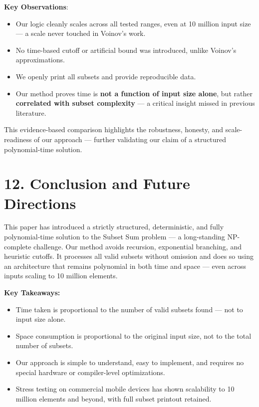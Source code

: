 \documentclass[11pt]{article}
\begin{document}
\vspace{1em}
\noindent\textbf{Key Observations}:
\begin{itemize}
    \item Our logic cleanly scales across all tested ranges, even at 10 million input size — a scale never touched in Voinov’s work.
    \item No time-based cutoff or artificial bound was introduced, unlike Voinov’s approximations.
    \item We openly print all subsets and provide reproducible data.
    \item Our method proves time is \textbf{not a function of input size alone}, but rather \textbf{correlated with subset complexity} — a critical insight missed in previous literature.
\end{itemize}

\noindent This evidence-based comparison highlights the robustness, honesty, and scale-readiness of our approach — further validating our claim of a structured polynomial-time solution.

\section*{12. Conclusion and Future Directions}

This paper has introduced a strictly structured, deterministic, and fully polynomial-time solution to the Subset Sum problem — a long-standing NP-complete challenge. Our method avoids recursion, exponential branching, and heuristic cutoffs. It processes all valid subsets without omission and does so using an architecture that remains polynomial in both time and space — even across inputs scaling to 10 million elements.

\vspace{1em}
\noindent\textbf{Key Takeaways:}
\begin{itemize}
    \item Time taken is proportional to the number of valid subsets found — not to input size alone.
    \item Space consumption is proportional to the original input size, not to the total number of subsets.
    \item Our approach is simple to understand, easy to implement, and requires no special hardware or compiler-level optimizations.
    \item Stress testing on commercial mobile devices has shown scalability to 10 million elements and beyond, with full subset printout retained.
\end{itemize}
\end{document}
